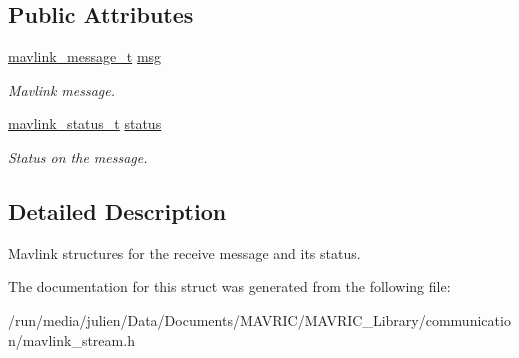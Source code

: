\subsection*{Public Attributes}
\begin{DoxyCompactItemize}
\item 
\hypertarget{structmavlink__received__t_a892a7015feac3f67a173e2fb190a8125}{\hyperlink{struct____mavlink__message}{mavlink\+\_\+message\+\_\+t} \hyperlink{structmavlink__received__t_a892a7015feac3f67a173e2fb190a8125}{msg}}\label{structmavlink__received__t_a892a7015feac3f67a173e2fb190a8125}

\begin{DoxyCompactList}\small\item\em Mavlink message. \end{DoxyCompactList}\item 
\hypertarget{structmavlink__received__t_a2224ecc05ff79c3a001aacb08a488477}{\hyperlink{struct____mavlink__status}{mavlink\+\_\+status\+\_\+t} \hyperlink{structmavlink__received__t_a2224ecc05ff79c3a001aacb08a488477}{status}}\label{structmavlink__received__t_a2224ecc05ff79c3a001aacb08a488477}

\begin{DoxyCompactList}\small\item\em Status on the message. \end{DoxyCompactList}\end{DoxyCompactItemize}


\subsection{Detailed Description}
Mavlink structures for the receive message and its status. 

The documentation for this struct was generated from the following file\+:\begin{DoxyCompactItemize}
\item 
/run/media/julien/\+Data/\+Documents/\+M\+A\+V\+R\+I\+C/\+M\+A\+V\+R\+I\+C\+\_\+\+Library/communication/mavlink\+\_\+stream.\+h\end{DoxyCompactItemize}
